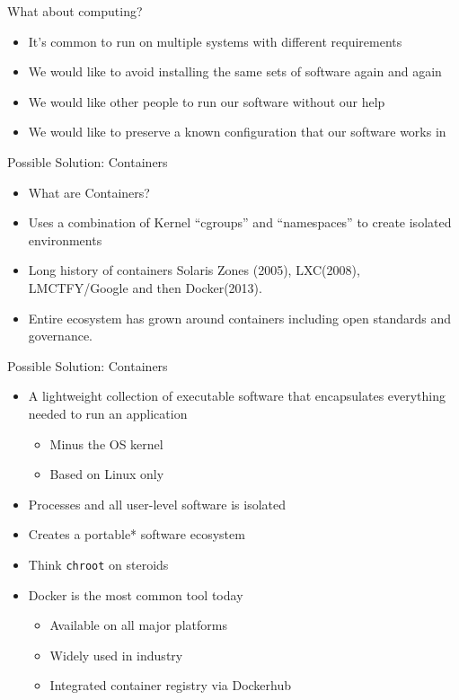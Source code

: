 \begin{frame}{What about computing?}
\begin{itemize}
\item It's common to run on multiple systems with different requirements
\item We would like to avoid installing the same sets of software again and again
\item We would like other people to run our software without our help
\item We would like to preserve a known configuration that our software works in
\end{itemize}
\end{frame}

\begin{frame}{Possible Solution: Containers}
\begin{itemize}
\item What are Containers?
\item Uses a combination of Kernel ``cgroups'' and ``namespaces'' to create isolated environments
\item Long history of containers Solaris Zones (2005), LXC(2008), LMCTFY/Google and then Docker(2013).
\item Entire ecosystem has grown around containers including open standards and governance.
\end{itemize}
\end{frame}

\begin{frame}{Possible Solution: Containers}
\begin{itemize}
\item A lightweight collection of executable software that encapsulates
everything needed to run an application
\begin{itemize}
\item Minus the OS kernel
\item Based on Linux only
\end{itemize}
\item Processes and all user-level software is isolated
\item Creates a portable* software ecosystem
\item Think \texttt{chroot} on steroids
\item Docker is the most common tool today
\begin{itemize}
\item Available on all major platforms
\item Widely used in industry
\item Integrated container registry via Dockerhub
\end{itemize}
\end{itemize}
\end{frame}


